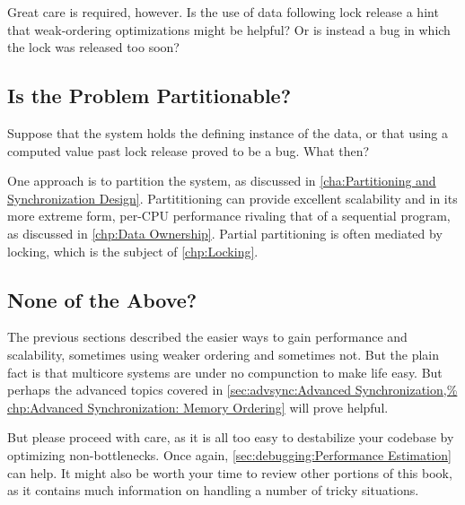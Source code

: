 Great care is required, however.
Is the use of data following lock release a hint that weak-ordering
optimizations might be helpful?
Or is instead a bug in which the lock was released too soon?

\subsection{Is the Problem Partitionable?}
\label{sec:app:questions:Is the Problem Partitionable?}

Suppose that the system holds the defining instance of the data,
or that using a computed value past lock release proved to be a bug.
What then?

One approach is to partition the system, as discussed in
\cref{cha:Partitioning and Synchronization Design}.
Partititioning can provide excellent scalability and in its more
extreme form, per-CPU performance rivaling that of a sequential program,
as discussed in \cref{chp:Data Ownership}.
Partial partitioning is often mediated by locking, which is the subject of
\cref{chp:Locking}.

\subsection{None of the Above?}
\label{sec:app:questions:None of the Above?}

The previous sections described the easier ways to gain performance
and scalability, sometimes using weaker ordering and sometimes not.
But the plain fact is that multicore systems are under no compunction
to make life easy.
But perhaps the advanced topics covered in
\cref{sec:advsync:Advanced Synchronization,%
chp:Advanced Synchronization: Memory Ordering}
will prove helpful.

But please proceed with care, as it is all too easy to destabilize
your codebase by optimizing non-bottlenecks.
Once again, \cref{sec:debugging:Performance Estimation} can help.
It might also be worth your time to review other portions of this
book, as it contains much information on handling a number of tricky
situations.
